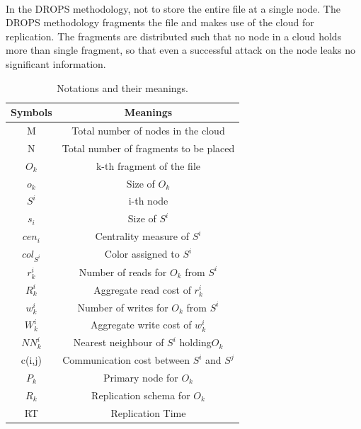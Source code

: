 \paragraph*{}
In the DROPS methodology, not to store the entire file at a single node. The DROPS
methodology fragments the file and makes use of the cloud for replication. The fragments
are distributed such that no node in a cloud holds more than single fragment, so that even
a successful attack on the node leaks no significant information.

\begin{table}
	\begin{center}
		\begin{tabular}{|c|c|} 
			\hline %
			Symbols & Meanings \\
			\hline
			M & Total number of nodes in the cloud \\
			\hline
			N & Total number of fragments to be placed \\
			\hline
			{$O_k$} & k-th fragment of the file \\
			\hline
			{$o_k$} & Size of {$O_k$} \\
			\hline
			{$S^i$} & i-th node \\
			\hline
			{$s_i$} & Size of {$S^i$}  \\
			\hline
			{$cen_i$} & Centrality measure of {$S^i$} \\
			\hline
			{$col_{S^i}$} & Color assigned to {$S^i$} \\								\hline
			{$r^i_k$} & Number of reads for {$O_k$} from {$S^i$} \\		
			\hline
			{$R^i_k$} & Aggregate read cost of  {$r^i_k$} \\		
			\hline
			{$w^i_k$} & Number of writes for {$O_k$} from {$S^i$} \\
			\hline
			{$W^i_k$} & Aggregate write cost of  {$w^i_k$} \\
			\hline
			{$N N^i_k$} & Nearest neighbour of {$S^i$} holding{$O_k$} \\
			\hline
			c(i,j) & Communication cost between {$S^i$} and {$S^j$} \\
			\hline
			{$P_k$} & Primary node for {$O_k$} \\
			\hline
			{$R_k$} & Replication schema for {$O_k$} \\
			\hline
			RT & Replication Time \\
			\hline
			
		\end{tabular}
		\caption{Notations and their meanings.}
	\end{center}
\end{table}

